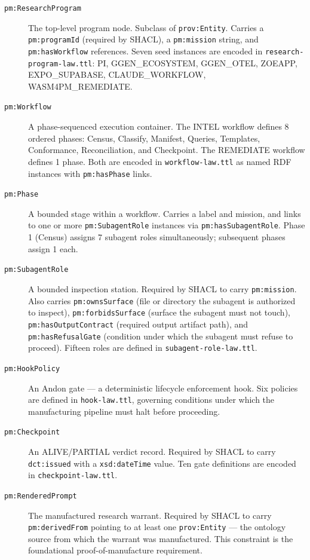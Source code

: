 \begin{description}
  \item[\texttt{pm:ResearchProgram}] The top-level program node. Subclass of
    \texttt{prov:Entity}. Carries a \texttt{pm:programId} (required by SHACL), a
    \texttt{pm:mission} string, and \texttt{pm:hasWorkflow} references. Seven seed instances
    are encoded in \texttt{research-program-law.ttl}: PI, GGEN\_ECOSYSTEM, GGEN\_OTEL,
    ZOEAPP, EXPO\_SUPABASE, CLAUDE\_WORKFLOW, WASM4PM\_REMEDIATE.

  \item[\texttt{pm:Workflow}] A phase-sequenced execution container. The INTEL workflow
    defines 8 ordered phases: Census, Classify, Manifest, Queries, Templates, Conformance,
    Reconciliation, and Checkpoint. The REMEDIATE workflow defines 1 phase. Both are encoded
    in \texttt{workflow-law.ttl} as named RDF instances with \texttt{pm:hasPhase} links.

  \item[\texttt{pm:Phase}] A bounded stage within a workflow. Carries a label and mission,
    and links to one or more \texttt{pm:SubagentRole} instances via
    \texttt{pm:hasSubagentRole}. Phase 1 (Census) assigns 7 subagent roles simultaneously;
    subsequent phases assign 1 each.

  \item[\texttt{pm:SubagentRole}] A bounded inspection station. Required by SHACL to carry
    \texttt{pm:mission}. Also carries \texttt{pm:ownsSurface} (file or directory the
    subagent is authorized to inspect), \texttt{pm:forbidsSurface} (surface the subagent
    must not touch), \texttt{pm:hasOutputContract} (required output artifact path), and
    \texttt{pm:hasRefusalGate} (condition under which the subagent must refuse to proceed).
    Fifteen roles are defined in \texttt{subagent-role-law.ttl}.

  \item[\texttt{pm:HookPolicy}] An Andon gate --- a deterministic lifecycle enforcement
    hook. Six policies are defined in \texttt{hook-law.ttl}, governing conditions under
    which the manufacturing pipeline must halt before proceeding.

  \item[\texttt{pm:Checkpoint}] An ALIVE/PARTIAL verdict record. Required by SHACL to
    carry \texttt{dct:issued} with a \texttt{xsd:dateTime} value. Ten gate definitions
    are encoded in \texttt{checkpoint-law.ttl}.

  \item[\texttt{pm:RenderedPrompt}] The manufactured research warrant. Required by SHACL
    to carry \texttt{pm:derivedFrom} pointing to at least one \texttt{prov:Entity} --- the
    ontology source from which the warrant was manufactured. This constraint is the
    foundational proof-of-manufacture requirement.


\end{description}
